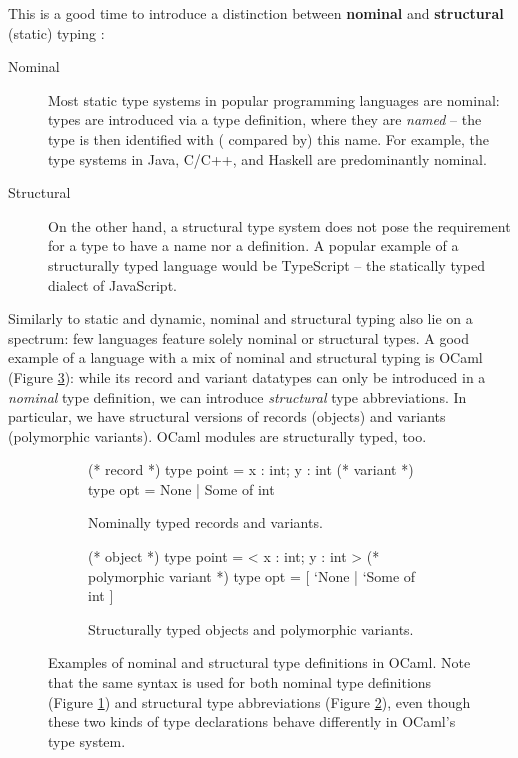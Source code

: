 \needspace{1em}
This is a good time to introduce a distinction between \textbf{nominal} and \textbf{structural} (static) typing \cite{tapl}: \begin{description}
    \item[Nominal] Most static type systems in popular programming languages are nominal: types are introduced via a type definition, where they are \emph{named} -- the type is then identified with (\eg{} compared by) this name. For example, the type systems in Java, C/C++, and Haskell are predominantly nominal.
    \item[Structural] On the other hand, a structural type system does not pose the requirement for a type to have a name nor a definition. A popular example of a structurally typed language would be TypeScript -- the statically typed dialect of JavaScript. 
\end{description}
Similarly to static and dynamic, nominal and structural typing also lie on a spectrum: few languages feature solely nominal or structural types. A good example of a language with a mix of nominal and structural typing is OCaml (Figure \ref{fig:nominal-and-structural-ocaml}): while its record and variant datatypes can only be introduced in a \emph{nominal} type definition, we can introduce \emph{structural} type abbreviations. In particular, we have structural versions of records (objects) and variants (polymorphic variants). OCaml modules are structurally typed, too.

\begin{figure}
    \centering
    \begin{subfigure}{.49\textwidth}
    \centering
    \begin{ocaml}
(* record *)
type point = { x : int; y : int }
(* variant *)
type opt = None | Some of int
    \end{ocaml}
    \caption{Nominally typed records and variants.}
    \label{subfig:nominal-ocaml}
    \end{subfigure}
    \hfill
    \begin{subfigure}{.49\textwidth}
    \centering
    \begin{ocaml}
(* object *)
type point = < x : int; y : int >
(* polymorphic variant *)
type opt = [ `None | `Some of int ]
    \end{ocaml}
    \caption{Structurally typed objects and polymorphic variants.}
    \label{subfig:structural-ocaml}
    \end{subfigure}
    \caption{Examples of nominal and structural type definitions in OCaml. Note that the same syntax is used for both nominal type definitions (Figure \ref{subfig:nominal-ocaml}) and structural type abbreviations (Figure \ref{subfig:structural-ocaml}), even though these two kinds of type declarations behave differently in OCaml's type system.}
    \label{fig:nominal-and-structural-ocaml}
\end{figure}

